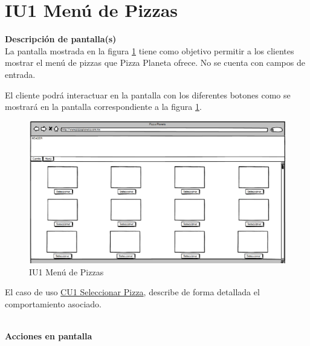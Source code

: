 
\pagebreak
\hypertarget{IU1}{}
\section{IU1 Menú de Pizzas}

	\noindent \textbf{Descripción de pantalla(s)}\\

		La pantalla mostrada en la figura \ref{IU1} tiene como objetivo permitir a los clientes mostrar el menú de pizzas que Pizza Planeta ofrece. 
		No se cuenta con campos de entrada. 
		
		El cliente podrá interactuar en la pantalla con los diferentes botones como se mostrará en la pantalla correspondiente a la figura \ref{IU1}.
		\begin{figure}[h]

			\begin{center}				

				\includegraphics[scale=0.50]{./imagenes/IUs/RegistroSolicitantes/iu1-IniciarSesion/IU1-MenuDePizzas.png}
				\caption{IU1 Menú de Pizzas}
				\label{IU1}

			\end{center}
				
		\end{figure}


		El caso de uso \hyperlink{CU1}{CU1 Seleccionar Pizza}, describe de forma detallada el comportamiento asociado.

	\noindent \textbf{\\Acciones en pantalla}


